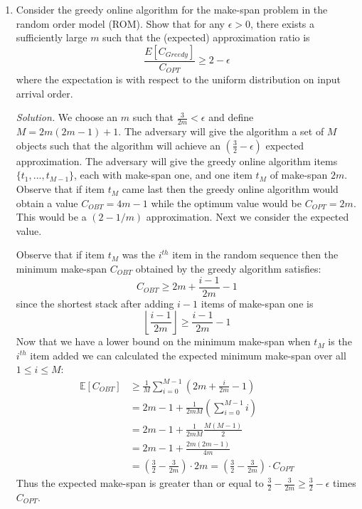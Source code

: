 \documentclass[11pt]{article}
\newcommand\E{\mathbb{E}}
\begin{document}
\begin{enumerate}
\item Consider the greedy online algorithm for the make-span problem in the random order model (ROM). Show that for any $\epsilon > 0$, there exists a sufficiently large $m$ such that the (expected) approximation ratio is
\[\frac{E[C_{Greedy}]}{C_{OPT}} \geq 2 - \epsilon\]
where the expectation is with respect to the uniform distribution on input arrival order.

\emph{Solution.} We choose an $m$ such that $\frac{3}{2m} < \epsilon$ and define $M = 2m(2m-1) + 1$. The adversary will give the algorithm a set of $M$ objects such that the algorithm will achieve an $\left(\frac{3}{2} - \epsilon\right)$ expected approximation. The adversary will give the greedy online algorithm items $\{t_1, ..., t_{M-1}\}$, each with make-span one, and one item $t_M$ of make-span $2m$. Observe that if item $t_M$ came last then the greedy online algorithm would obtain a value $C_{OBT} = 4m - 1$ while the optimum value would be $C_{OPT} = 2m$. This would be a $(2 - 1/m)$ approximation. Next we consider the expected value.

Observe that if item $t_M$ was the $i^{th}$ item in the random sequence then the minimum make-span $C_{OBT}$ obtained by the greedy algorithm satisfies:
\[C_{OBT} \geq 2m + \frac{i-1}{2m} - 1\]
since the shortest stack after adding $i-1$ items of make-span one is \[\left\lfloor\frac{i-1}{2m}\right\rfloor \geq \frac{i-1}{2m} - 1\]
Now that we have a lower bound on the minimum make-span when $t_M$ is the $i^{th}$ item added we can calculated the expected minimum make-span over all $1 \leq i \leq M$:
\begin{align}
\E[C_{OBT}] &\geq \frac{1}{M}\sum_{i=0}^{M-1}\left(2m + \frac{i}{2m} - 1\right)\\
&= 2m - 1 + \frac{1}{2mM}\left(\sum_{i=0}^{M-1}i\right) \\
&= 2m - 1 + \frac{1}{2mM}\frac{M(M-1)}{2} \\
&= 2m - 1 + \frac{2m(2m-1)}{4m}\\
&= \left(\frac{3}{2} - \frac{3}{2m}\right) \cdot 2m = \left(\frac{3}{2} - \frac{3}{2m}\right) \cdot C_{OPT}
\end{align}
Thus the expected make-span is greater than or equal to $\frac{3}{2} - \frac{3}{2m} \geq \frac{3}{2} - \epsilon$ times $C_{OPT}$. 
\begin{comment}
\emph{Solution.} We choose an $m$ such that $1/m < \epsilon$ and define $M = 2m(2m-1) + 1$. Observe that if the expected approximation ratio is $2 - 1/m$ then this would also be a $2 - \epsilon$ approximation. The adversary will give the greedy online algorithm a set consisting of $M - 2$ items $\{t_1, ..., t_{M-2}\}$, each with make-span one, and two items $t_{M-1}$ and $t_M$ of make-span $m$. Observe that if item $t_M$ came last then the greedy online algorithm would obtain a value $C_{OBT} = 4m - 1$ while the optimum value would be $C_{OPT} = 2m$. This would be a $(2 - 1/m)$ approximation. We just need to show that this happens on average.


\end{comment}
\end{enumerate}
\end{document}
